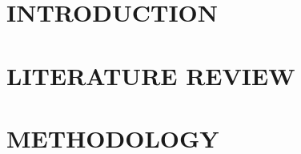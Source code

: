 \documentclass[a4paper,12pt,twoside]{report}
\begin{document}
\renewcommand\listtablename{\normalsize\normalfont\centering\vspace*{-0.5in} ACKNOWLEDGMENTS}

\iftablespage
{}
{}
\fi

\renewcommand\listtablename{\normalsize\normalfont\centering\vspace*{-0.5in} ABSTRACT}
\iftablespage
{}
{}
\fi
\label{chap:ABSTRACT}


\renewcommand\listtablename{\normalsize\normalfont\centering\vspace*{-0.5in} ABSTRAK}
\iftablespage
{}
{}
\fi
\label{chap:ABSTRAK}

\clearpage



\newpage
\thesiscopyrightpage %


\afterpreface  %

\pagestyle{plain}\cleardoublepage%
\chapter{INTRODUCTION}\label{chap:Introduction}


\pagestyle{plain}\cleardoublepage %
\chapter{LITERATURE REVIEW}\label{chap:LR}


\pagestyle{plain}\cleardoublepage %
\chapter{METHODOLOGY}\label{chap:methodology}

\end{document}
